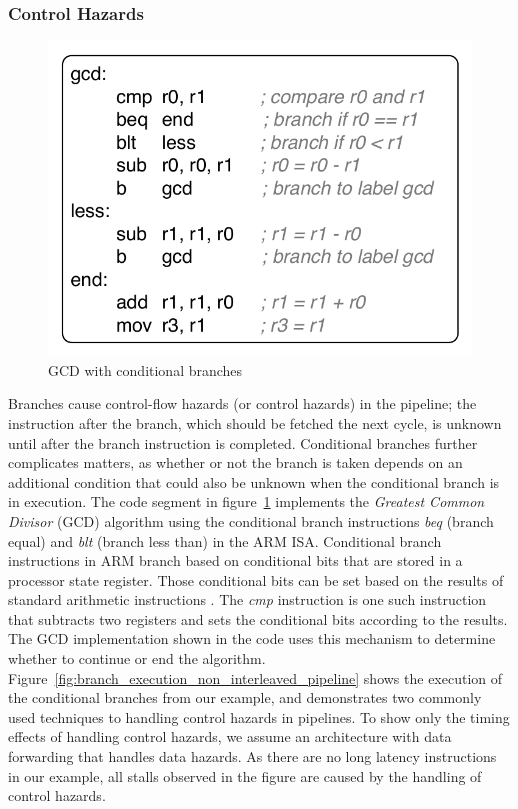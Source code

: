 \subsubsection{Control Hazards}
\begin{figure}
  \vspace{-20pt}
  \begin{center}
    \includegraphics[scale=.65]{figs/sample_gcd_code}
  \end{center}
  \vspace{-3mm}
  \caption{GCD with conditional branches}
  \label{fig:sample_gcd_code}
\end{figure}

Branches cause control-flow hazards (or control hazards) in the pipeline; the instruction after the branch, which should be fetched the next cycle, is unknown until after the branch instruction is completed.
Conditional branches further complicates matters, as whether or not the branch is taken depends on an additional condition that could also be unknown when the conditional branch is in execution. 
The code segment in figure~\ref{fig:sample_gcd_code} implements the \emph{Greatest Common Divisor} (GCD) algorithm using the conditional branch instructions \emph{beq} (branch equal) and \emph{blt} (branch less than) in the ARM ISA.  
Conditional branch instructions in ARM branch based on conditional bits that are stored in a processor state register.
Those conditional bits can be set based on the results of standard arithmetic instructions .
The \emph{cmp} instruction is one such instruction that subtracts two registers and sets the conditional bits according to the results.
The GCD implementation shown in the code uses this mechanism to determine whether to continue or end the algorithm.
Figure~\ref{fig:branch_execution_non_interleaved_pipeline} shows the execution of the conditional branches from our example, and demonstrates two commonly used techniques to handling control hazards in pipelines. 
To show only the timing effects of handling control hazards, we assume an architecture with data forwarding that handles data hazards.
As there are no long latency instructions in our example, all stalls observed in the figure are caused by the handling of control hazards.  


